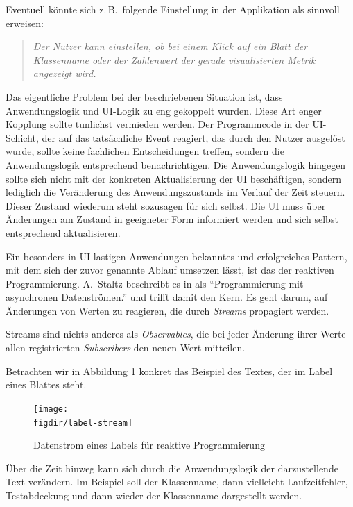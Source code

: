 Eventuell könnte sich z.\,B.\ folgende Einstellung in der Applikation als sinnvoll erweisen:

\begin{quotation}
  \textit{Der Nutzer kann einstellen, ob bei einem Klick auf ein Blatt der Klassenname oder der Zahlenwert der gerade visualisierten Metrik angezeigt wird.}
\end{quotation}

Das eigentliche Problem bei der beschriebenen Situation ist, dass Anwendungslogik und UI-Logik zu eng gekoppelt wurden. Diese Art enger Kopplung sollte tunlichst vermieden werden. Der Programmcode in der UI-Schicht, der auf das tatsächliche Event reagiert, das durch den Nutzer ausgelöst wurde, sollte keine fachlichen Entscheidungen treffen, sondern die Anwendungslogik entsprechend benachrichtigen. Die Anwendungslogik hingegen sollte sich nicht mit der konkreten Aktualisierung der UI beschäftigen, sondern lediglich die Veränderung des Anwendungszustands im Verlauf der Zeit steuern. Dieser Zustand wiederum steht sozusagen für sich selbst. Die UI muss über Änderungen am Zustand in geeigneter Form informiert werden und sich selbst entsprechend aktualisieren.

Ein besonders in UI-lastigen Anwendungen bekanntes und erfolgreiches Pattern, mit dem sich der zuvor genannte Ablauf umsetzen lässt, ist das der reaktiven Programmierung. A.\ Staltz beschreibt es in \cite{staltz2016introduction} als "`Programmierung mit asynchronen Datenströmen."' und trifft damit den Kern. Es geht darum, auf Änderungen von Werten zu reagieren, die durch \textit{Streams} propagiert werden.

Streams sind nichts anderes als \textit{Observables}, die bei jeder Änderung ihrer Werte allen registrierten \textit{Subscribers} den neuen Wert mitteilen.

Betrachten wir in Abbildung \ref{fig:label-stream} konkret das Beispiel des Textes, der im Label eines Blattes steht.

\begin{figure}[htb]
  \texttt{[image: \\figdir/label-stream]}
  \caption{Datenstrom eines Labels für reaktive Programmierung}
  \label{fig:label-stream}
\end{figure}

Über die Zeit hinweg kann sich durch die Anwendungslogik der darzustellende Text verändern. Im Beispiel soll der Klassenname, dann vielleicht Laufzeitfehler, Testabdeckung und dann wieder der Klassenname dargestellt werden.

